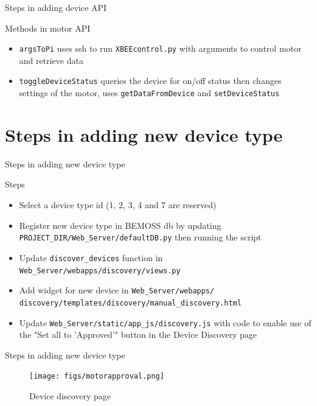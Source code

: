 \documentclass{beamer}
\begin{document}
\begin{frame}{Steps in adding device API}{}
\begin{block}{Methods in motor API}
\begin{itemize}
	\item \texttt{argsToPi} uses ssh to run \texttt{XBEEcontrol.py} with arguments to control motor and retrieve data
	\item \texttt{toggleDeviceStatus} queries the device for on/off status then changes settings of the motor, uses \texttt{getDataFromDevice} and \texttt{setDeviceStatus}
\end{itemize}
\end{block}
\end{frame}

\section{Steps in adding new device type}
\begin{frame}{Steps in adding new device type}{}
\begin{block}{Steps}
\begin{itemize}
\item Select a device type id (1, 2, 3, 4 and 7 are reserved)
\item Register new device type in BEMOSS db by updating \texttt{PROJECT\_DIR/Web\_Server/defaultDB.py} then running the script
\item Update \texttt{discover\_devices} function in \texttt{Web\_Server/webapps/discovery/views.py}
\item Add widget for new device in \texttt{Web\_Server/webapps/
discovery/templates/discovery/manual\_discovery.html}
\item Update \texttt{Web\_Server/static/app\_js/discovery.js} with code to enable use of the "Set all to 'Approved'" button in the Device Discovery page
\end{itemize}
\end{block}
\end{frame}

\begin{frame}{Steps in adding new device type}{}
\begin{figure}
\texttt{[image: figs/motorapproval.png]}
\caption{Device discovery page}
\end{figure}
\end{frame}
\end{document}
